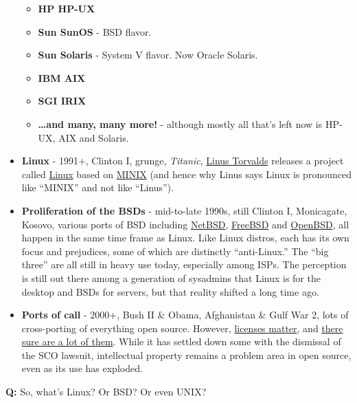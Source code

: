 \documentclass[10pt,]{book}
\numberwithin{figure}{chapter}
\begin{document}
\begin{itemize}
  \begin{itemize}
  \itemsep1pt\parskip0pt
  \item
    \textbf{HP HP-UX}
  \item
    \textbf{Sun SunOS} - BSD flavor.
  \item
    \textbf{Sun Solaris} - System V flavor. Now Oracle Solaris.
  \item
    \textbf{IBM AIX}
  \item
    \textbf{SGI IRIX}
  \item
    \textbf{\ldots{}and many, many more!} - although mostly all that's
    left now is HP-UX, AIX and Solaris.
  \end{itemize}
\item
  \textbf{Linux} - 1991+, Clinton I, grunge, \emph{Titanic},
  \href{https://en.wikipedia.org/wiki/Linus_Torvalds}{Linus Torvalds}
  releases a project called
  \href{https://en.wikipedia.org/wiki/Linux}{Linux}  based
  on \href{https://en.wikipedia.org/wiki/MINIX}{MINIX} (and hence why
  Linus says Linux is pronounced like ``MINIX'' and not like ``Linus'').
\item
  \textbf{Proliferation of the BSDs} - mid-to-late 1990s, still Clinton
  I, Monicagate, Kosovo, various ports of BSD including
  \href{https://en.wikipedia.org/wiki/NetBSD}{NetBSD}, 
  \href{https://en.wikipedia.org/wiki/FreeBSD}{FreeBSD} 
  and \href{https://en.wikipedia.org/wiki/OpenBSD}{OpenBSD},
   all happen in the same time frame as Linux. Like Linux
  distros, each has its own focus and prejudices, some of which are
  distinctly ``anti-Linux.'' The ``big three'' are all still in heavy
  use today, especially among ISPs. The perception is still out there
  among a generation of sysadmins that Linux is for the desktop and BSDs
  for servers, but that reality shifted a long time ago.
\item
  \textbf{Ports of call} - 2000+, Bush II \& Obama, Afghanistan \& Gulf
  War 2, lots of cross-porting of everything open source. However,
  \href{https://en.wikipedia.org/wiki/Open-source_license}{licenses
  matter}, and
  \href{https://en.wikipedia.org/wiki/Comparison_of_free_and_open-source_software_licenses}{there
  sure are a lot of them}. While it has settled down some with the
  dismissal of the SCO lawsuit, intellectual property remains a problem
  area in open source, even as its use has exploded.
\end{itemize}

\textbf{Q:} So, what's Linux? Or BSD? Or even UNIX?
\end{document}
